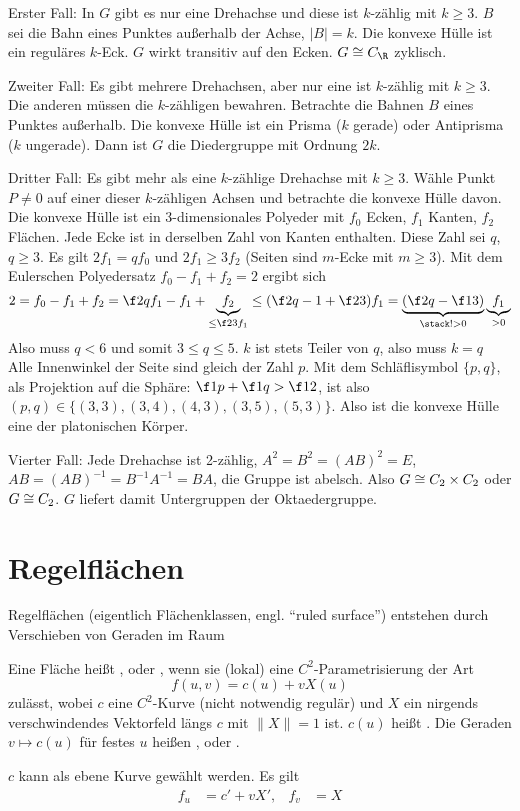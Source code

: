 Erster Fall:
In $G$ gibt es nur eine Drehachse und diese ist $k$-zählig mit $k \ge 3$.
$B$ sei die Bahn eines Punktes außerhalb der Achse, $|B| = k$.
Die konvexe Hülle ist ein reguläres $k$-Eck.
$G$ wirkt transitiv auf den Ecken.
$G \isomorphic C_\R$ zyklisch.

Zweiter Fall:
Es gibt mehrere Drehachsen, aber nur eine ist $k$-zählig mit $k \ge 3$.
Die anderen müssen die $k$-zähligen bewahren.
Betrachte die Bahnen $B$ eines Punktes außerhalb.
Die konvexe Hülle ist ein Prisma ($k$ gerade) oder Antiprisma ($k$ ungerade).
Dann ist $G$ die Diedergruppe mit Ordnung $2k$.

Dritter Fall:
Es gibt mehr als eine $k$-zählige Drehachse mit $k \ge 3$.
Wähle Punkt $P \neq 0$ auf einer dieser $k$-zähligen Achsen und betrachte die konvexe Hülle davon.
Die konvexe Hülle ist ein 3-dimensionales Polyeder mit $f_0$ Ecken, $f_1$ Kanten, $f_2$ Flächen.
Jede Ecke ist in derselben Zahl von Kanten enthalten.
Diese Zahl sei $q$, $q \ge 3$.
Es gilt $2 f_1 = q f_0$ und $2f_1 \ge 3 f_2$ (Seiten sind $m$-Ecke mit $m \ge 3$).
Mit dem Eulerschen Polyedersatz $f_0 - f_1 + f_2 = 2$ ergibt sich
\[
	2 = f_0 - f_1 + f_2
	= \f 2q f_1 - f_1 + \underbrace{f_2}_{\le \f 23 f_1}
	\le (\f 2q - 1 + \f 23) f_1
	= \underbrace{(\f 2q - \f 13)}_{\stack !> 0} \underbrace{f_1}_{> 0}
\]
Also muss $q < 6$ und somit $3 \le q \le 5$.
$k$ ist stets Teiler von $q$, also muss $k = q$
Alle Innenwinkel der Seite sind gleich der Zahl $p$.
Mit dem Schläflisymbol $\{p, q\}$, als Projektion auf die Sphäre: $\f 1p + \f 1q > \f 12$, ist also $(p,q) \in \{ (3,3), (3,4), (4, 3), (3,5), (5,3) \}$.
Also ist die konvexe Hülle eine der platonischen Körper.

Vierter Fall:
Jede Drehachse ist 2-zählig, $A^2 = B^2 = (AB)^2 = E$, $AB = (AB)^{-1} = B^{-1} A^{-1} = BA$, die Gruppe ist abelsch.
Also $G \cong C_2 \times C_2$ oder $G \cong C_2$.
$G$ liefert damit Untergruppen der Oktaedergruppe.




\section{Regelflächen}


Regelflächen (eigentlich Flächenklassen, engl. “ruled surface”) entstehen durch Verschieben von Geraden im Raum

\begin{df}
	Eine Fläche heißt , oder , wenn sie (lokal) eine $C^2$-Parametrisierung der Art
	\[
		f(u,v) = c(u) + v X(u)
	\]
	zulässt, wobei $c$ eine $C^2$-Kurve (nicht notwendig regulär) und $X$ ein nirgends verschwindendes Vektorfeld längs $c$ mit \oBdA $\|X\| = 1$ ist.
	$c(u)$ heißt .
	Die Geraden $v \mapsto c(u)$ für festes $u$ heißen , oder .
	\begin{note}
		$c$ kann als ebene Kurve gewählt werden.
		Es gilt
		\begin{align*}
			f_u &= c' + vX', &
			f_v &= X
		\end{align*}
	\end{note}
\end{df}

